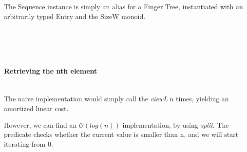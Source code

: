 \documentclass[12pt,twoside,notitlepage]{report}
\begin{document}
The Sequence instance is simply an alias for a Finger Tree, instantiated with an arbitrarily typed Entry and the SizeW monoid.

\begin{code}
\\
\>[0]\<[4]%
\>[4] \AgdaSymbol{:}  \AgdaSymbol{\{}\AgdaSymbol{\}(} \AgdaSymbol{:}  \AgdaSymbol{)}    \<%
\\
\>[0]\<[4]%
\>[4] \AgdaSymbol{\{}\AgdaSymbol{\}}   \AgdaSymbol{=}  \AgdaSymbol{(} \AgdaSymbol{)} \AgdaSymbol{(} \AgdaSymbol{\{}\AgdaSymbol{\})} \AgdaSymbol{\{}\AgdaSymbol{\}}\<%
\\
\end{code}

\paragraph{Retrieving the nth element} \mbox{} \\ 
The naive implementation would simply call the \textit{viewL} n times, yielding an amortized linear cost.

However, we can find an $\mathcal{O}(log(n))$ implementation, by using \textit{split}. The predicate checks whether the current value is smaller than n, and we will start iterating from 0.

\begin{code}
\>[0]\<[4]%
\>[4]\AgdaFunction{\_!\_} \AgdaSymbol{:}  \AgdaSymbol{\{}\AgdaSymbol{\}\{} \AgdaSymbol{:}  \AgdaSymbol{\}\{} \AgdaSymbol{:} \AgdaSymbol{\}}         \<%
\\
\>[0]\<[4]%
\>[4] \AgdaFunction{!}       \AgdaSymbol{(} \AgdaSymbol{)}  \AgdaSymbol{)} \AgdaSymbol{(} \AgdaSymbol{)} \<%
\\
\>[0]\<[4]%
\>[4] \AgdaFunction{!}  \AgdaSymbol{|}  \AgdaSymbol{(} \AgdaSymbol{\_}  \AgdaSymbol{\_)} \AgdaSymbol{=}  \AgdaSymbol{(} \AgdaSymbol{)}\<%
\\
\>[0]\<[4]%
\>[4] \AgdaFunction{!}  \AgdaSymbol{|}  \AgdaSymbol{=} \<%
\\
\end{code}
\end{document}
